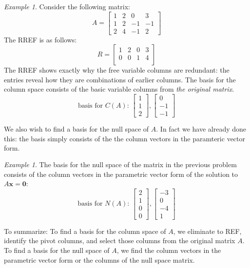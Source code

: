 \documentclass[11pt,oneside]{amsbook}
\theoremstyle{definition}
\theoremstyle{plain}
\theoremstyle{definition}
\theoremstyle{remark}
\newtheorem{example}[theorem]{Example}
\numberwithin{equation}{section}
\numberwithin{figure}{section}
\begin{document}
\begin{example}
  Consider the following matrix:
  \[A=\begin{bmatrix}1&2&0&3\\1&2&-1&-1\\2&4&-1&2\end{bmatrix}
  \]
  The RREF is as follows:
  \[R=\begin{bmatrix}1&2&0&3\\0&0&1&4\\&&&\end{bmatrix}
  \]
  The RREF shows exactly why the free variable columns are redundant: the entries reveal how they are combinations of earlier columns. The basis for the column space consists of the basic variable columns from \emph{the original matrix}.
  \[\text{basis for $C(A)$: }\begin{bmatrix}1\\1\\2\end{bmatrix},
  \begin{bmatrix}0\\-1\\-1\end{bmatrix}
  \]
\end{example}

We also wish to find a basis for the null space of $A$. In fact we have already done this: the basis simply consists of the the column vectors in the paramteric vector form.

\begin{example}
  The basis for the null space of the matrix in the previous problem consists of the column vectors in the parametric vector form of the solution to $A\mathbf{x}=\mathbf{0}$:
  \[\text{basis for $N(A)$: }\begin{bmatrix}2\\1\\0\\0\end{bmatrix},
  \begin{bmatrix}-3\\0\\-4\\1\end{bmatrix}
  \]
\end{example}

To summarize: To find a basis for the column space of $A$, we eliminate to REF, identify the pivot columns, and select those columns from the original matrix $A$. To find a basis for the null space of $A$, we find the column vectors in the  parametric vector form or the columns of the null space matrix.
\end{document}
